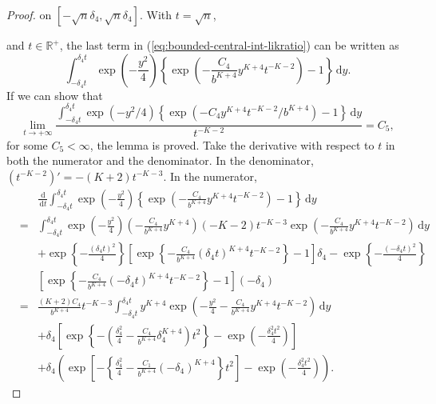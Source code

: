 \documentclass[oneside,english]{amsbook}
\numberwithin{section}{chapter}
\numberwithin{equation}{section}
\numberwithin{figure}{section}
\theoremstyle{plain}
\theoremstyle{plain}
\theoremstyle{definition}
\theoremstyle{plain}
\theoremstyle{plain}
\theoremstyle{remark}
\theoremstyle{definition}
\theoremstyle{definition}
\newcommand{\diff}{\,\mathrm{d}}
\begin{document}
\begin{proof}
on $\left[-\sqrt{n}\delta_{4},\sqrt{n}\delta_{4}\right]$. With $t=\sqrt{n}$,%

{} and $t\in\mathbb{R}^{+}$, the last term in (\ref{eq:bounded-central-int-likratio})
can be written as 
\[
\int_{-\delta_{4}t}^{\delta_{4}t}\exp\left(-\frac{y^{2}}{4}\right)\left\{ \exp\left(-\frac{C_{4}}{b^{K+4}}y^{K+4}t^{-K-2}\right)-1\right\} \diff y.
\]
If we can show that 
\[
\lim_{t\rightarrow+\infty}\frac{\int_{-\delta_{4}t}^{\delta_{4}t}\exp\left(-y^{2}/4\right)\left\{ \exp\left(-C_{4}y^{K+4}t^{-K-2}/b^{K+4}\right)-1\right\} \diff y}{t^{-K-2}}=C_{5},
\]
for some $C_{5}<\infty$, the lemma is proved. Take the derivative
with respect to $t$ in both the numerator and the denominator. In the denominator,
$\left(t^{-K-2}\right)'=-\left(K+2\right)t^{-K-3}.$ In the numerator,
\begin{eqnarray}
 &  & \frac{\diff}{\diff t}\int_{-\delta_{4}t}^{\delta_{4}t}\exp\left(-\frac{y^{2}}{4}\right)\left\{ \exp\left(-\frac{C_{4}}{b^{K+4}}y^{K+4}t^{-K-2}\right)-1\right\} \diff y\nonumber \\
 & = & \int_{-\delta_{4}t}^{\delta_{4}t}\exp\left(-\frac{y^{2}}{4}\right)\left(-\frac{C_{4}}{b^{K+4}}y^{K+4}\right)\left(-K-2\right)t^{-K-3}\exp\left(-\frac{C_{4}}{b^{K+4}}y^{K+4}t^{-K-2}\right)\diff y\nonumber \\
 &  & +\exp\left\{ -\frac{\left(\delta_{4}t\right)^{2}}{4}\right\} \left[\exp\left\{ -\frac{C_{4}}{b^{K+4}}\left(\delta_{4}t\right)^{K+4}t^{-K-2}\right\} -1\right]\delta_{4}-\exp\left\{ -\frac{\left(-\delta_{4}t\right)^{2}}{4}\right\} \nonumber \\
 &  & \left[\exp\left\{ -\frac{C_{4}}{b^{K+4}}\left(-\delta_{4}t\right)^{K+4}t^{-K-2}\right\} -1\right]\left(-\delta_{4}\right)\nonumber \\
 & = & \frac{\left(K+2\right)C_{4}}{b^{K+4}}t^{-K-3}\int_{-\delta_{4}t}^{\delta_{4}t}y^{K+4}\exp\left(-\frac{y^{2}}{4}-\frac{C_{4}}{b^{K+4}}y^{K+4}t^{-K-2}\right)\diff y\nonumber \\
 &  & +\delta_{4}\left[\exp\left\{ -\left(\frac{\delta_{4}^{2}}{4}-\frac{C_{4}}{b^{K+4}}\delta_{4}^{K+4}\right)t^{2}\right\} -\exp\left(-\frac{\delta_{4}^{2}t^{2}}{4}\right)\right]\label{eq:lhospital-diff-numerator}\\
 &  & +\delta_{4}\left(\exp\left[-\left\{ \frac{\delta_{4}^{2}}{4}-\frac{C_{1}}{b^{K+4}}\left(-\delta_{4}\right)^{K+4}\right\} t^{2}\right]-\exp\left(-\frac{\delta_{4}^{2}t^{2}}{4}\right)\right).\nonumber 
\end{eqnarray}

\end{proof}
\end{document}
